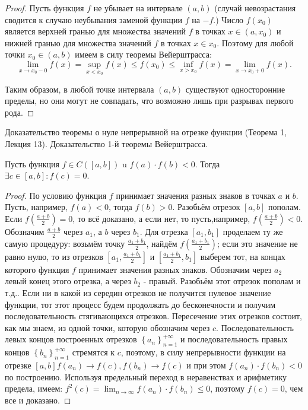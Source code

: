 \begin{proof}
    Пусть функция $f$ не убывает на интервале $(a, b)$ (случай невозрастания сводится к случаю неубывания заменой функции $f$ на $-f$.) Число $f\left(x_0\right)$ является верхней гранью для множества значений $f$ в точках $x \in\left(a, x_0\right)$ и нижней гранью для множества значений $f$ в точках $x \in x_0$. Поэтому для любой точки $x_0 \in(a, b)$ имеем в силу теоремы Вейерштрасса:
    $$
        \lim _{x \rightarrow x_0-0} f(x)=\sup _{x<x_0} f(x) \leq f\left(x_0\right) \leq \inf _{x>x_0} f(x)=\lim _{x \rightarrow x_0+0} f(x) .
    $$

    Таким образом, в любой точке интервала $(a, b)$ существуют односторонние пределы, но они могут не совпадать, что возможно лишь при разрывах первого рода.
\end{proof}

\newpage
\begin{problem}
Доказательство теоремы о нуле непрерывной на отрезке функции (Теорема 1, Лекция
13). Доказательство 1-й теоремы Вейерштрасса.
\end{problem}
\begin{theorem}
    Пусть функция $f \in C([a, b])$ u $f(a) \cdot f(b)<0$. Тогда $\exists c \in[a, b]: f(c)=0$.
\end{theorem}

\begin{proof}
    По условию функция $f$ принимает значения разных знаков в точках $a$ и $b$. Пусть, например, $f(a)<0$, тогда $f(b)>0$. Разобьём отрезок $[a, b]$ пополам. Если $f\left(\frac{a+b}{2}\right)=0$, то всё доказано, а если нет, то пусть,например, $f\left(\frac{a+b}{2}\right)<0$. Обозначим $\frac{a+b}{2}$ через $a_1$, а $b$ через $b_1$. Для отрезка $\left[a_1, b_1\right]$ проделаем ту же самую процедуру: возьмём точку $\frac{a_1+b_1}{2}$, найдём $f\left(\frac{a_1+b_1}{2}\right)$; если это значение не равно нулю, то из отрезков $\left[a_1, \frac{a_1+b_1}{2}\right]$ и $\left[\frac{a_1+b_1}{2}, b_1\right]$ выберем тот, на концах которого функция $f$ принимает значения разных знаков. Обозначим через $a_2$ левый конец этого отрезка, а через $b_2$ - правый. Разобьём этот отрезок пополам и т.д.. Если ни в какой из середин отрезков не получится нулевое значение функции, тот этот процесс будем продолжать до бесконечности и получим последовательность стягивающихся отрезков. Пересечение этих отрезков состоит, как мы знаем, из одной точки, которую обозначим через $c$. Последовательность левых концов построенных отрезков $\left\{a_n\right\}_{n=1}^{+\infty}$ и последовательность правых концов $\left\{b_n\right\}_{n=1}^{+\infty}$ стремятся к $c$, поэтому, в силу непрерывности функции на отрезке $[a, b] f\left(a_n\right) \rightarrow f(c), f\left(b_n\right) \rightarrow f(c)$ и при этом $f\left(a_n\right) \cdot f\left(b_n\right)<0$ по построению. Используя предельный переход в неравенствах и арифметику предела, имеем: $f^2(c)=\lim _{n \rightarrow \infty} f\left(a_n\right) \cdot f\left(b_n\right) \leq 0$, поэтому $f(c)=0$, чем все и доказано.
\end{proof}

